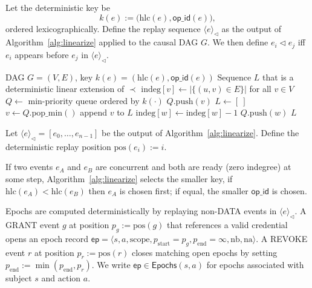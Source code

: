 \documentclass[10pt,journal,compsoc]{IEEEtran}
\begin{document}
Let the deterministic key be
\[
  k(e) := \big(\mathrm{hlc}(e),\mathsf{op\_id}(e)\big),
\]
ordered lexicographically. Define the replay sequence $\langle e\rangle_{\triangleleft}$ as the output of Algorithm~\ref{alg:linearize} applied to the causal DAG $G$. We then define $e_i \triangleleft e_j$ iff $e_i$ appears before $e_j$ in $\langle e\rangle_{\triangleleft}$.

\begin{algorithm}[!htbp]
\caption{Deterministic linearization of a causal DAG}
\label{alg:linearize}
\begin{algorithmic}[1]
\Require DAG $G=(V,E)$, key $k(e)=(\mathrm{hlc}(e),\mathsf{op\_id}(e))$
\Ensure Sequence $L$ that is a deterministic linear extension of $\prec$
\State $\mathrm{indeg}[v] \gets |\{(u,v)\in E\}|$ for all $v\in V$
\State $Q \gets$ min-priority queue ordered by $k(\cdot)$
  \State $Q.\mathrm{push}(v)$
\EndFor
\State $L \gets [\ ]$
  \State $v \gets Q.\mathrm{pop\_min}()$
  \State append $v$ to $L$
    \State $\mathrm{indeg}[w] \gets \mathrm{indeg}[w]-1$
      \State $Q.\mathrm{push}(w)$
    \EndIf
  \EndFor
\EndWhile
\State \Return $L$
\end{algorithmic}
\end{algorithm}

\noindent Let $\langle e \rangle_{\triangleleft} = [e_0,\dots,e_{n-1}]$ be the output of Algorithm~\ref{alg:linearize}.
Define the deterministic replay position $\mathrm{pos}(e_i) := i$.

If two events $e_A$ and $e_B$ are concurrent and both are ready (zero indegree) at some step, Algorithm~\ref{alg:linearize} selects the smaller key, if $\mathrm{hlc}(e_A)<\mathrm{hlc}(e_B)$ then $e_A$ is chosen first; if equal, the smaller $\mathsf{op\_id}$ is chosen.




Epochs are computed deterministically by replaying non-\textsc{DATA} events in $\langle e \rangle_{\triangleleft}$.
A \textsc{GRANT} event $g$ at position $p_g := \mathrm{pos}(g)$ that references a valid credential opens an epoch record
$\mathsf{ep} = \langle s,a,\mathrm{scope}, p_{\mathrm{start}}{=}p_g, p_{\mathrm{end}}{=}\infty, \mathrm{nb}, \mathrm{na} \rangle$.
A \textsc{REVOKE} event $r$ at position $p_r := \mathrm{pos}(r)$ closes matching open epochs by setting
$p_{\mathrm{end}} := \min(p_{\mathrm{end}}, p_r)$.
We write $\mathsf{ep}\in \mathsf{Epochs}(s,a)$ for epochs associated with subject $s$ and action $a$.
\end{document}
